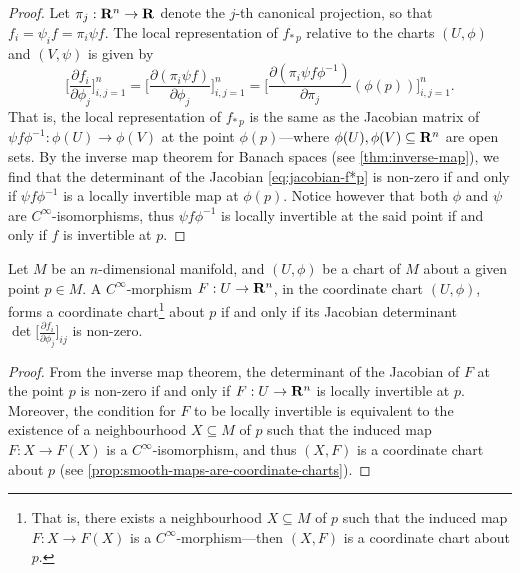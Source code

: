 \begin{proof}
Let \(\pi_j: \mathbf{R}^n \to \mathbf{R}\) denote the \(j\)-th canonical projection, so that
\(f_i = \psi_i f = \pi_i \psi f\). The local representation of \(f_{*\, p}\)
relative to the charts \((U, \phi)\) and \((V, \psi)\) is given by
\begin{equation}\label{eq:jacobian-f*p}
\Big[ \frac{\partial f_{i}}{\partial \phi_{j}} \Big]_{i, j=1}^n
= \Big[ \frac{\partial (\pi_i \psi f)}{\partial \phi_{j}} \Big]_{i, j=1}^n
= \Big[
\frac{\partial (\pi_i \psi f \phi^{-1})}{\partial \pi_j}(\phi(p))
\Big]_{i, j=1}^n.
\end{equation}
That is, the local representation of \(f_{*\, p}\) is the same as the Jacobian
matrix of \(\psi f \phi^{-1}: \phi(U) \to \phi(V)\) at the point
\(\phi(p)\)---where \(\phi(U), \phi(V) \subseteq \mathbf{R}^n\) are open sets. By the
inverse map theorem for Banach spaces (see \cref{thm:inverse-map}), we find that
the determinant of the Jacobian \cref{eq:jacobian-f*p} is non-zero if and only
if \(\psi f \phi^{-1}\) is a locally invertible map at \(\phi(p)\). Notice
however that both \(\phi\) and \(\psi\) are \(C^{\infty}\)-isomorphisms, thus
\(\psi f \phi^{-1}\) is locally invertible at the said point if and only if
\(f\) is invertible at \(p\).
\end{proof}

\begin{corollary}
\label{cor:inverse-map-theorem-manifolds}
Let \(M\) be an \(n\)-dimensional manifold, and \((U, \phi)\) be a chart of
\(M\) about a given point \(p \in M\). A \(C^{\infty}\)-morphism
\(F: U \to \mathbf{R}^n\), in the coordinate chart \((U, \phi)\), forms a
coordinate chart\footnote{
  That is, there exists a neighbourhood \(X \subseteq M\) of \(p\) such that the
  induced map \(F: X \to F(X)\) is a \(C^{\infty}\)-morphism---then \((X, F)\)
  is a coordinate chart about \(p\).
} about \(p\) if and only if its Jacobian
determinant \(\det \big[\frac{\partial f_{i}}{\partial \phi_j}\big]_{ij}\) is
non-zero.
\end{corollary}

\begin{proof}
From the inverse map theorem, the determinant of the Jacobian of \(F\) at the
point \(p\) is non-zero if and only if \(F: U \to \mathbf{R}^n\) is locally invertible
at \(p\). Moreover, the condition for \(F\) to be locally invertible is
equivalent to the existence of a neighbourhood \(X \subseteq M\) of \(p\) such
that the induced map \(F: X \to F(X)\) is a \(C^{\infty}\)-isomorphism, and thus
\((X, F)\) is a coordinate chart about \(p\) (see
\cref{prop:smooth-maps-are-coordinate-charts}).
\end{proof}

